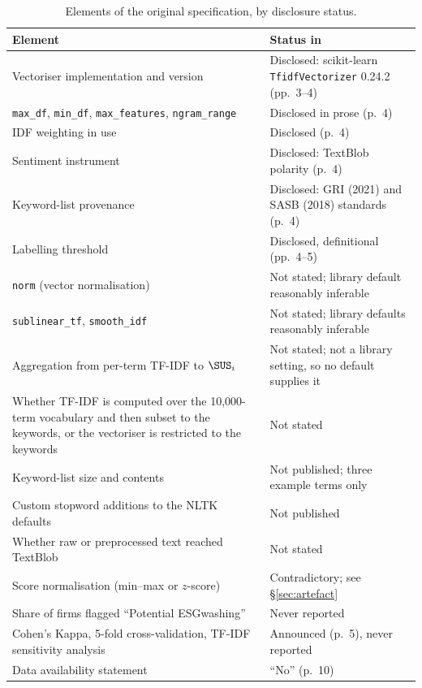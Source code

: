 \begin{table}[ht]
\centering
\small
\caption{Elements of the original specification, by disclosure status.}
\label{tab:original-disclosure}
\begin{tabular}{p{}p{}}
\toprule
Element & Status in \citet{lagasio2024} \\
\midrule
Vectoriser implementation and version & Disclosed: scikit-learn \texttt{TfidfVectorizer} 0.24.2 (pp.~3--4) \\
\texttt{max\_df}, \texttt{min\_df}, \texttt{max\_features}, \texttt{ngram\_range} & Disclosed in prose (p.~4) \\
IDF weighting in use & Disclosed (p.~4) \\
Sentiment instrument & Disclosed: TextBlob polarity (p.~4) \\
Keyword-list provenance & Disclosed: GRI (2021) and SASB (2018) standards (p.~4) \\
Labelling threshold & Disclosed, definitional (pp.~4--5) \\
\addlinespace
\texttt{norm} (vector normalisation) & Not stated; library default reasonably inferable \\
\texttt{sublinear\_tf}, \texttt{smooth\_idf} & Not stated; library defaults reasonably inferable \\
Aggregation from per-term TF-IDF to $\SUS_i$ & Not stated; not a library setting, so no default supplies it \\
Whether TF-IDF is computed over the 10,000-term vocabulary and then subset to the keywords, or the vectoriser is restricted to the keywords & Not stated \\
Keyword-list size and contents & Not published; three example terms only \\
Custom stopword additions to the NLTK defaults & Not published \\
Whether raw or preprocessed text reached TextBlob & Not stated \\
Score normalisation (min--max or $z$-score) & Contradictory; see \S\ref{sec:artefact} \\
Share of firms flagged ``Potential ESGwashing'' & Never reported \\
Cohen's Kappa, 5-fold cross-validation, TF-IDF sensitivity analysis & Announced (p.~5), never reported \\
Data availability statement & ``No'' (p.~10) \\
\bottomrule
\end{tabular}
\end{table}

